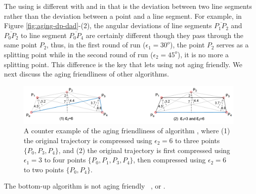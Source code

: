 The \dpa using \dad is different with \ped and \sed in that \dad is the deviation between two line segments rather than the deviation between a point and a line segment. For example, in Figure \ref{fig:aging-dp-dad}-(2), the angular deviations of line segments $\overline{P_1P_2}$ and $\overline{P_0P_2}$ to line segment $\overline{P_0P_4}$ are certainly different though they pass through the same point $P_2$, thus, in the first round of run ($\epsilon_1=30^o$), the point $P_2$ serves as a splitting point while in the second round of run ($\epsilon_2=45^o$), it is no more a splitting point. This difference is the key that lets \dpa using \dad not aging friendly.
%
We next discuss the aging friendliness of other algorithms.

\begin{figure}
	\centering
	\includegraphics[scale=0.66]{Figures/Fig-aging-pavlidis.png}

	\caption{\small A counter example of the aging friendliness of algorithm \tpa, where (1) the original trajectory is compressed using $\epsilon_2=6$ to three points $\{P_0, P_3, P_4\}$, and (2) the original trajectory is first compressed using $\epsilon_1=3$ to four points $\{P_0, P_1, P_3, P_4\}$, then compressed using $\epsilon_2=6$ to two points $\{P_0, P_4\}$. }
	\vspace{-1ex}
	\label{fig:aging-pavlidis}
\end{figure}


\begin{proposition}
\label{theo-aging-tp}
The bottom-up algorithm \tpa is not aging friendly \wrt~\ped, \sed or \dad.
\end{proposition}

